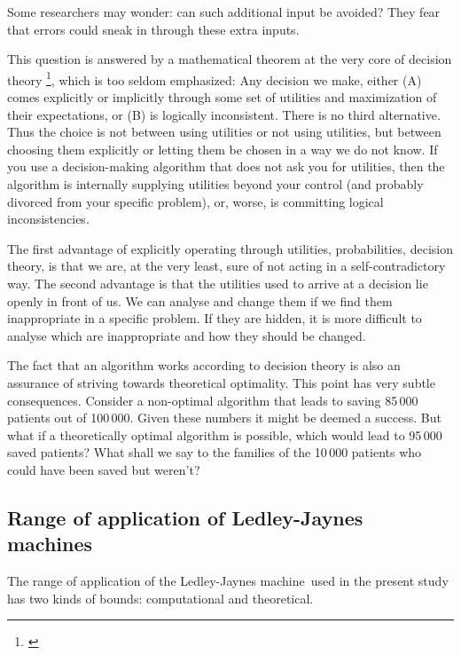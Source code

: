 \documentclass[utf8]{FrontiersinHarvard} %
\renewcommand*{\|}[1][]{\nonscript\:#1\vert\nonscript\:\mathopen{}}
\newcommand*{\ljm}{Ledley-Jaynes machine}
\begin{document}
Some researchers may wonder: can such additional input be avoided? They fear that errors could sneak in through these extra inputs.

This question is answered by a mathematical theorem at the very core of decision theory \footnote{\citet{savage1954_r1972,luceetal1957,raiffaetal1961_r2000,atkinsonetal1964,ferguson1967,lindley1971_r1988,kreps1988,bernardoetal1994_r2000,prattetal1995_r1996,lindley2006_r2014,pettigrew2011_r2019}}, which is too seldom emphasized: Any decision we make, either (A) comes explicitly or implicitly through some set of utilities and maximization of their expectations, or (B) is logically inconsistent. There is no third alternative. Thus the choice is not between using utilities or not using utilities, but between choosing them explicitly or letting them be chosen in a way we do not know. If you use a decision-making algorithm that does not ask you for utilities, then the algorithm is internally supplying utilities beyond your control (and probably divorced from your specific problem), or, worse, is committing logical inconsistencies.

The first advantage of explicitly operating through utilities, probabilities, decision theory, is that we are, at the very least, sure of not acting in a self-contradictory way. The second advantage is that the utilities used to arrive at a decision lie openly in front of us. We can analyse and change them if we find them inappropriate in a specific problem. If they are hidden, it is more difficult to analyse which are inappropriate and how they should be changed.

The fact that an algorithm works according to decision theory is also an assurance of striving towards theoretical optimality. This point has very subtle consequences. Consider a non-optimal algorithm that leads to saving 85\,000 patients out of 100\,000. Given these numbers it might be deemed a success. But what if a theoretically optimal algorithm is possible, which would lead to 95\,000 saved patients? What shall we say to the families of the 10\,000 patients who could have been saved but weren't?

\subsection{Range of application of \ljm s}
\label{sec:rangeLJM}

The range of application of the \ljm\ used in the present study has two kinds of bounds: computational and theoretical.
\end{document}
